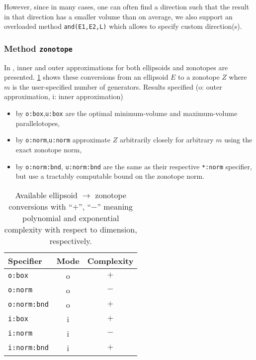 However, since in many cases, one can often find a direction such that the result in that direction has a smaller volume than on average, we also support an overloaded method \texttt{and(E1,E2,L)} which allows to specify custom direction(s).

\subsubsection{Method \texttt{zonotope}} \label{sec:ell_zonotope}

In \cite{Gassmann2020a}, inner and outer approximations for both ellipsoids and zonotopes are presented. \cref{tab:ell_zono} shows these conversions from an ellipsoid $E$ to a zonotope $Z$ where $m$ is the user-specified number of generators. Results specified (o: outer approximation, i: inner approximation)
\begin{itemize}
    \item by \texttt{o:box},\texttt{u:box} are the optimal minimum-volume and maximum-volume parallelotopes,
    \item by \texttt{o:norm},\texttt{u:norm} approximate $Z$ arbitrarily closely for arbitrary $m$ using the exact zonotope norm,
    \item by \texttt{o:norm:bnd}, \texttt{u:norm:bnd} are the same as their respective \texttt{*:norm} specifier, but use a tractably computable bound on the zonotope norm.
\end{itemize}

\begin{table}[h]
    \caption{Available ellipsoid $\rightarrow$ zonotope conversions with ``$+$'', ``$-$'' meaning polynomial and exponential complexity with respect to dimension, respectively.}
    \centering
    \label{tab:ell_zono}
    \begin{tabular}{lcc}
        \toprule
        \textbf{Specifier}  & \textbf{Mode} & \textbf{Complexity} \\
        \midrule
        \texttt{o:box}      & o             & $+$                 \\
        \texttt{o:norm}     & o             & $-$                 \\
        \texttt{o:norm:bnd} & o             & $+$                 \\
        \texttt{i:box}      & i             & $+$                 \\
        \texttt{i:norm}     & i             & $-$                 \\
        \texttt{i:norm:bnd} & i             & $+$                 \\
        \bottomrule
    \end{tabular}
\end{table}

